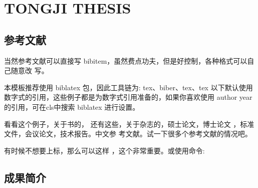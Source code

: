 \documentclass[twoside]{article}
\begin{document}
    \section*{TONGJI THESIS}
\setcounter{section}{1}
\subsection{参考文献}
\label{sec:bib}
当然参考文献可以直接写 bibitem，虽然费点功夫，但是好控制，各种格式可以自己随意改
写。

本模板推荐使用 biblatex 包，因此工具链为: tex、biber、tex、tex
以下默认使用数字式的引用，这些例子都是为数字式引用准备的，如果你喜欢使用 author year 的引用，可在cls中搜索 biblatex 进行设置。

看看这个例子，关于书的\cite{tex, companion,
ColdSources}， 还有这些\cite{Krasnogor2004e, clzs,
zjsw}，关于杂志的\cite{ELIDRISSI94,
  MELLINGER96, SHELL02}，硕士论文\cite{zhubajie, metamori2004}，博士论文
\cite{shaheshang, FistSystem01}，标准文件\cite{IEEE-1363}，会议论文\cite{DPMG,kocher99}，技术报告\cite{NPB2}。中文参
考文献\cite{cnarticle}。试一下很多个参考文献的情况吧\cite{BogdanSLOPEAdaptiveVariable2014,GossmannIdentificationsignificantgenetic2015,AlbrechtTopologicalapproachfuzzy1999,AlbrechtTopologicalConceptsHierarchies2001,AlbrechtTopologicaltheoryfuzziness1999,MoriasiModelevaluationguidelines2007,Jdatamodels2003}。

有时候不想要上标，那么可以这样 \parencite{shaheshang}，这个非常重要。或使用命令: 

    \printbibliography[heading=subbibliography]

\subsection{成果简介}
    \begin{refsection}

    \setcounter{gbnamefmtcase}{1}%
    \nocite{ref-1-1-Yang,ref-2-1-杨轶,ref-3-1-杨轶,ref-4-1-Yang,ref-5-1-Wu,ref-6-1-贾泽,ref-7-1-伍晓明}

    \printbibliography[heading=subbibliography,title={论文成果}]

    \end{refsection}


    \begin{refsection}

    \setcounter{gbnamefmtcase}{3}%
    \nocite{ref-8-1-任天令,ref-9-1-Ren}

    \printbibliography[heading=subbibliography,title={专利成果}]

    \end{refsection}

    
\end{document}
